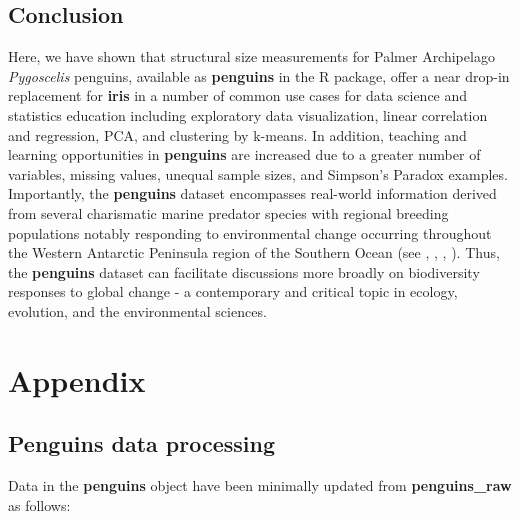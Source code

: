 \hypertarget{conclusion}{%
\subsection{Conclusion}\label{conclusion}}

Here, we have shown that structural size measurements for Palmer
Archipelago \emph{Pygoscelis} penguins, available as \textbf{penguins}
in the  R package, offer a near drop-in
replacement for \textbf{iris} in a number of common use cases for data
science and statistics education including exploratory data
visualization, linear correlation and regression, PCA, and clustering by
k-means. In addition, teaching and learning opportunities in
\textbf{penguins} are increased due to a greater number of variables,
missing values, unequal sample sizes, and Simpson's Paradox examples.
Importantly, the \textbf{penguins} dataset encompasses real-world
information derived from several charismatic marine predator species
with regional breeding populations notably responding to environmental
change occurring throughout the Western Antarctic Peninsula region of
the Southern Ocean (see \citet{bestelmeyer_analysis_2011},
\citet{gorman_ecological_2014}, \citet{gorman_integrative_2015},
\citet{gorman_population_2017}). Thus, the \textbf{penguins} dataset can
facilitate discussions more broadly on biodiversity responses to global
change - a contemporary and critical topic in ecology, evolution, and
the environmental sciences.

\hypertarget{appendix}{%
\section*{Appendix}\label{appendix}}

\hypertarget{penguins-data-processing}{%
\subsection{Penguins data processing}\label{penguins-data-processing}}

Data in the \textbf{penguins} object have been minimally updated from
\textbf{penguins\_raw} as follows:

